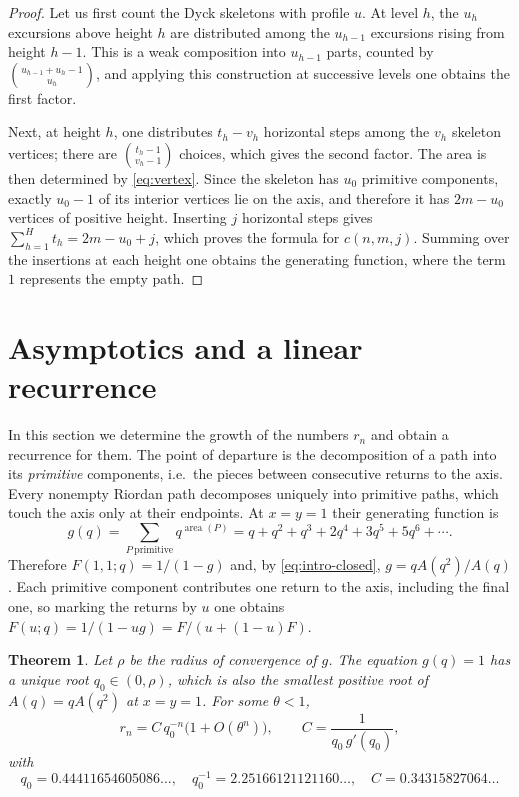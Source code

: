 \documentclass[11pt,reqno]{amsart}
\numberwithin{equation}{section}
\newtheorem{theorem}{Theorem}[section]
\theoremstyle{remark}
\newcommand{\area}{\operatorname{area}}
\begin{document}
\begin{proof}
Let us first count the Dyck skeletons with profile $u$. At level $h$, the $u_h$
excursions above height $h$ are distributed among the $u_{h-1}$ excursions rising from
height $h-1$. This is a weak composition into $u_{h-1}$ parts, counted by
$\binom{u_{h-1}+u_h-1}{u_h}$, and applying this construction at successive levels one
obtains the first factor.

Next, at height $h$, one distributes $t_h-v_h$ horizontal steps among the $v_h$ skeleton
vertices; there are $\binom{t_h-1}{v_h-1}$ choices, which gives the second factor. The
area is then determined by \eqref{eq:vertex}. Since the skeleton has $u_0$ primitive
components, exactly $u_0-1$ of its interior vertices lie on the axis, and therefore it
has $2m-u_0$ vertices of positive height. Inserting $j$ horizontal steps gives
$\sum_{h=1}^{H}t_h=2m-u_0+j$, which proves the formula for $c(n,m,j)$. Summing over the
insertions at each height one obtains the generating function, where the term $1$
represents the empty path.
\end{proof}

\section{Asymptotics and a linear recurrence}\label{sec:asym}

In this section we determine the growth of the numbers $r_n$ and obtain a recurrence for
them. The point of departure is the decomposition of a path into its \emph{primitive}
components, i.e.\ the pieces between consecutive returns to the axis. Every nonempty
Riordan path decomposes uniquely into primitive paths, which touch the axis only at their
endpoints. At $x=y=1$ their generating function is
\[
g(q)=\sum_{P\ \text{primitive}}q^{\area(P)}=q+q^2+q^3+2q^4+3q^5+5q^6+\cdots.
\]
Therefore $F(1,1;q)=1/(1-g)$ and, by \eqref{eq:intro-closed}, $g=qA(q^2)/A(q)$. Each
primitive component contributes one return to the axis, including the final one, so
marking the returns by $u$ one obtains $F(u;q)=1/(1-ug)=F/(u+(1-u)F)$.

\begin{theorem}\label{thm:asym}
Let $\rho$ be the radius of convergence of $g$. The equation $g(q)=1$ has a unique root
$q_0\in(0,\rho)$, which is also the smallest positive root of $A(q)=qA(q^2)$ at
$x=y=1$. For some $\theta<1$,
\[
r_n=C\,q_0^{-n}\big(1+O(\theta^n)\big),\qquad C=\frac{1}{q_0\,g'(q_0)},
\]
with
\[
q_0=0.44411654605086\ldots,\quad q_0^{-1}=2.25166121121160\ldots,\quad C=0.34315827064\ldots
\]
\end{theorem}
\end{document}
